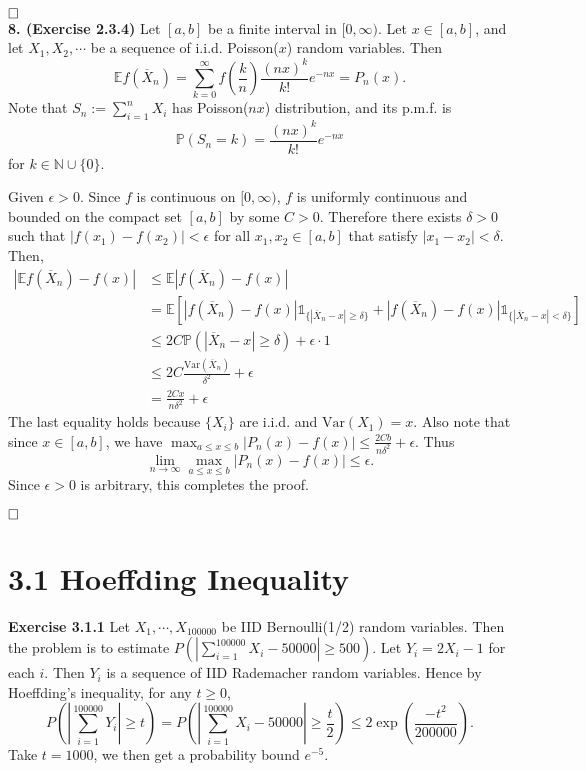 \documentclass[12pt]{extarticle}
\begin{document}
$\hspace{\fill}\square$
\\
\textbf{8. (Exercise 2.3.4)} Let $[a,b]$ be a finite interval in $[0,\infty)$.
Let $x\in[a,b]$, and let $X_1,X_2,\cdots$ be a sequence of i.i.d. Poisson($x$) random variables.
Then
\[
\mathbb{E}f(\overline{X}_n)
=
\sum_{k=0}^\infty f\left(\frac{k}{n}\right)\frac{(nx)^k}{k!}e^{-nx}=P_n(x).
\]
Note that $S_n:=\sum_{i=1}^nX_i$ has Poisson($nx$) distribution, and its p.m.f. is
\[
\mathbb{P}(S_n=k)=\frac{(nx)^k}{k!}e^{-nx}
\]
for $k\in\mathbb{N}\cup\{0\}$.

Given $\epsilon>0$. Since $f$ is continuous on $[0,\infty)$, $f$ is uniformly continuous and bounded on the compact set $[a,b]$ by some $C>0$.
Therefore there exists $\delta>0$ such that $|f(x_1)-f(x_2)|<\epsilon$ for all $x_1,x_2\in[a,b]$ that satisfy $|x_1-x_2|<\delta$.
Then,
\[
\begin{aligned}
\left|\mathbb{E}f(\overline{X}_n)-f(x)\right|
&\leq
\mathbb{E}\left|f(\overline{X}_n)-f(x)\right|
\\&
=\mathbb{E}\left[\left|f(\overline{X}_n)-f(x)\right|\mathds{1}_{\{|\overline{X}_n-x|\geq\delta\}}
+
\left|f(\overline{X}_n)-f(x)\right|\mathds{1}_{\{|\overline{X}_n-x|<\delta\}}\right]
\\&
\leq 2C\mathbb{P}(|\overline{X}_n-x|\geq\delta)+\epsilon\cdot 1
\\&
\leq 2C\frac{\text{Var}(\overline{X}_n)}{\delta^2}+\epsilon
\\&
=\frac{2Cx}{n\delta^2}+\epsilon
\end{aligned}
\]
The last equality holds because $\{X_i\}$ are i.i.d. and $\text{Var}(X_1)=x$.
Also note that since $x\in[a,b]$,
we have $\max_{a\leq x\leq b}|P_n(x)-f(x)|\leq\frac{2Cb}{n\delta^2}+\epsilon$. Thus
\[
\lim_{n\rightarrow\infty}\max_{a\leq x\leq b}|P_n(x)-f(x)|\leq\epsilon.
\]
Since $\epsilon>0$ is arbitrary, this completes the proof.

$\hspace{\fill}\square$
\newpage
\section*{3.1 Hoeffding Inequality}
\textbf{Exercise 3.1.1} 
Let $X_1,\cdots,X_{100000}$ be IID Bernoulli(1/2) random variables.
Then the problem is to estimate $P(|\sum_{i=1}^{100000}X_i-50000|\geq 500)$.
Let $Y_i=2X_i-1$ for each $i$. Then $Y_i$ is a sequence of IID Rademacher random variables. Hence by Hoeffding's inequality, for any $t\geq 0$,
\[
P\left(\left|\sum_{i=1}^{100000}Y_i\right|\geq t\right)
=P\left(
\left|
\sum_{i=1}^{100000}X_i-50000
\right|\geq \frac{t}{2}
\right)
\leq
2\exp\left(\frac{-t^2}{200000}\right).
\]
Take $t=1000$, we then get a probability bound $e^{-5}$.
\end{document}
